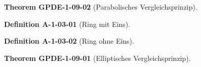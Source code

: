 \documentclass[10pt, letterpaper]{article}
\newcommand{\CustomHeading}[3]{%
  \par\medskip\noindent%
  \textbf{#1 #2} \textnormal{(#3)}.\enskip%
}
\newenvironment{DEF}[2]{\CustomHeading{Definition}{#1}{#2}}{}
\newenvironment{THEO}[2]{\CustomHeading{Theorem}{#1}{#2}}{}
\begin{document}

\begin{THEO}{GPDE-1-09-02}{Parabolisches Vergleichsprinzip}
\end{THEO}


\begin{DEF}{A-1-03-01}{Ring mit Eins}
\end{DEF}


\begin{DEF}{A-1-03-02}{Ring ohne Eins}
\end{DEF}


\begin{THEO}{GPDE-1-09-01}{Elliptisches Vergleichsprinzip}
\end{THEO}
\end{document}
